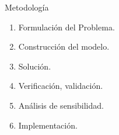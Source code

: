 \begin{frame}{Metodología}
  \begin{enumerate} \justifying \parskip3mm
  \item Formulación del Problema.
  \item Construcción del modelo.
  \item Solución.
  \item Verificación, validación. 
  \item Análisis de sensibilidad.
  \item Implementación.
  \end{enumerate}
\end{frame}






